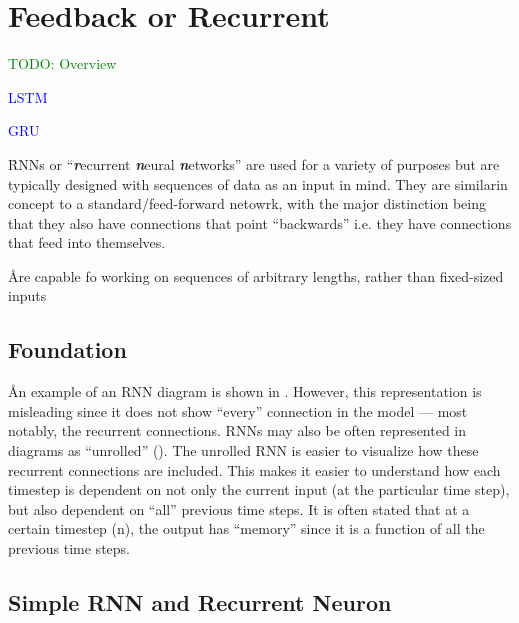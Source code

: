 \section{Feedback or Recurrent}

\textcolor{green}{TODO: Overview}


\textcolor{blue}{LSTM}

\textcolor{blue}{GRU}

\r{RNNs or ``\textit{\textbf{r}}ecurrent \textit{\textbf{n}}eural \textit{\textbf{n}}etworks'' are used for a variety of purposes but are typically designed with sequences of data as an input in mind. They are similarin concept to a standard/feed-forward netowrk, with the major distinction being that they also have connections that point ``backwards'' i.e. they have connections that feed into themselves.}

\r{Are capable fo working on sequences of arbitrary lengths, rather than fixed-sized inputs}

\subsection{Foundation}

\r{An example of an RNN diagram is shown in . However, this representation is misleading since it does not show ``every'' connection in the model --- most notably, the recurrent connections.  RNNs may also be often represented in diagrams as ``unrolled'' (). The unrolled RNN is easier to visualize how these recurrent connections are included.  This makes it easier to understand how each timestep is dependent on not only the current input (at the particular time step), but also dependent on ``all'' previous time steps. It is often stated that at a certain timestep (n), the output has ``memory'' since it is a function of all the previous time steps.}



\subsection{Simple RNN and Recurrent Neuron}


